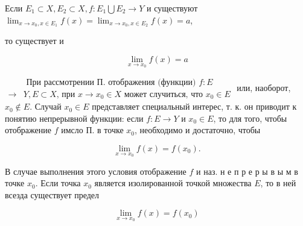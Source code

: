 \documentclass[10pt]{article}
\begin{document}
Если $E_{1} \subset X, E_{2} \subset X, f: E_{1} \bigcup E_{2} \rightarrow Y$ и существуют $\lim _{x \rightarrow x_{0}, x \in E_{1}} f(x)=\lim _{x \rightarrow x_{0}, x \in E_{2}} f(x)=a$,



то существует и



\[

\lim _{x \rightarrow x_{0}} f(x)=a

\]



$\begin{aligned} & \text { При рассмотрении П. отображения (функции) } f: E \\ \rightarrow & Y, E \subset X \text {, при } x \rightarrow x_{0} \in X \text { может случиться, что } x_{0} \in E\end{aligned}$ или, наоборот, $x_{0} \notin E$. Случай $x_{0} \in E$ представляет специальный интерес, т. к. он приводит к понятию непрерывной функции: если $f: E \rightarrow Y$ и $x_{0} \in E$, то для того, чтобы отображение $f$ имсло П. в точке $x_{0}$, необходимо и достаточно, чтобы



\[

\lim _{x \rightarrow x_{0}} f(x)=f\left(x_{0}\right) .

\]



В случае выполнения этого условия отображение $f$ и наз. н е п р е р ы в ы м в точке $x_{0}$. Если точка $x_{0}$ является изолированной точкой множества $E$, то в ней всезда существует предел



\[

\lim _{x \rightarrow x_{0}} f(x)=f\left(x_{0}\right)

\]
\end{document}

